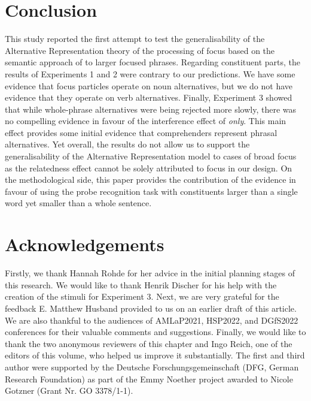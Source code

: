 \documentclass[output=paper,colorlinks,citecolor=brown]{langscibook}
\begin{document}
\section{Conclusion}
This study reported the first attempt to test the generalisability of the Alternative Representation theory of the processing of focus based on the semantic approach of \citet{rooth1992} to larger focused phrases. Regarding constituent parts, the results of Experiments 1 and 2 were contrary to our predictions. We have some evidence that focus particles operate on noun alternatives, but we do not have evidence that they operate on verb alternatives. Finally, Experiment 3 showed that while whole-phrase alternatives were being rejected more slowly, there was no compelling evidence in favour of the interference effect of \textit{only}. This main effect provides some initial evidence that comprehenders represent phrasal alternatives. Yet overall, the results do not allow us to support the generalisability of the Alternative Representation model to cases of broad focus as the relatedness effect cannot be solely attributed to focus in our design. On the methodological side, this paper provides the contribution of the evidence in favour of using the probe recognition task with constituents larger than a single word yet smaller than a whole sentence. 

\section*{Acknowledgements}
Firstly, we thank Hannah Rohde for her advice in the initial planning stages of this research. We would like to thank Henrik Discher for his help with the creation of the stimuli for Experiment 3. Next, we are very grateful for the feedback E. Matthew Husband provided to us on an earlier draft of this article. We are also thankful to the audiences of AMLaP2021, HSP2022, and DGfS2022 conferences for their valuable comments and suggestions. Finally, we would like to thank the two anonymous reviewers of this chapter and Ingo Reich, one of the editors of this volume, who helped us improve it substantially. The first and third author were  supported  by  the  Deutsche  Forschungsgemeinschaft (DFG,  German Research  Foundation)  as  part  of  the  Emmy Noether  project  awarded  to  Nicole  Gotzner (Grant  Nr.  GO 3378/1-1). 



{\sloppy\printbibliography[heading=subbibliography,notkeyword=this]}
\end{document}
